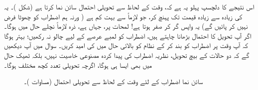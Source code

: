 اس نتیجے کا دلچسپ پہلو یہ ہے کہ، وقت کے لحاظ سے تحویلی احتمال سائن نما  کرتا ہے (شکل )۔
 یہ  کی زیادہ سے زیادہ قیمت تک پہنچ کر، جو لازماً  سے بہت کم ہے ( ورنہ ہم اضطراب کو چھوٹا فرض نہیں کر پائیں گے) یہ واپس گر کر صفر ہوتا ہے! لمحات  پر، جہاں  ہے، ذرہ لازماً نچلے حال میں ہوگا۔ اگر آپ تحویل کا احتمال بڑھانا چاہتے ہیں، اضطراب کو لمبے عرصے کے لیے چالو نہ رکھیں؛ بہتر ہوگا کہ آپ وقت  پر اضطراب کو بند کر کے نظام کو بالائی حال میں  کی امید کریں۔ سوال  میں آپ دیکھیں گے کہ دو حالات کے بیچ تحویل، نظریہ اضطراب کی پیدا کردہ مصنوعی خاصیت نہیں، بلکہ ٹھیک حال میں بھی ایسا ہی ہوگا، اگرچہ تحویلی تعدد کچھ مختلف ہوگا۔

\begin{figure}
\centering
{}
\caption{سائن نما اضطراب کے لئے وقت کے لحاظ سے تحویلی احتمال (مساوات )۔}
\label{شکل_تابع_وقت_احتمال_سائن_نما_احتمال}
\end{figure}


